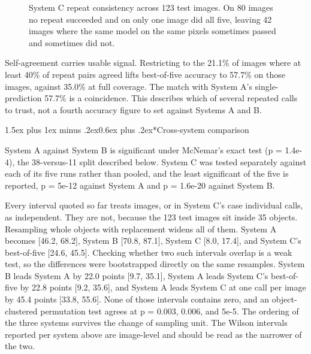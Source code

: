 \documentclass[12pt,letterpaper]{article}
\makeatletter
\renewcommand{\subsection}{\@startsection{subsection}{2}{0pt}%
  {1.5ex plus 1ex minus .2ex}{0.6ex plus .2ex}{\normalsize\itshape}}
\makeatother
\begin{document}
\begin{figure}[H]
\centering
{}
\caption{System C repeat consistency across 123 test images. On 80
images no repeat succeeded and on only one image did all five, leaving
42 images where the same model on the same pixels sometimes passed and
sometimes did not.}
\label{fig:repeats}
\end{figure}

Self-agreement carries usable signal. Restricting to the 21.1\% of
images where at least 40\% of repeat pairs agreed lifts best-of-five
accuracy to 57.7\% on those images, against 35.0\% at full coverage.
The match with System A's single-prediction 57.7\% is a coincidence.
This describes
which of several repeated calls to trust, not a fourth accuracy figure
to set against Systems A and B.

\subsection*{Cross-system comparison}

System A against System B is significant under McNemar's exact test
(p = 1.4e-4), the 38-versus-11 split described below. System C was
tested separately against each of its five runs rather than pooled, and
the least significant of the five is reported, p = 5e-12 against System
A and p = 1.6e-20 against System B.

Every interval quoted so far treats images, or in System C's case
individual calls, as independent. They are not, because the 123 test
images sit inside 35 objects. Resampling whole objects with replacement
widens all of them. System A becomes [46.2, 68.2], System B
[70.8, 87.1], System C [8.0, 17.4], and System C's best-of-five
[24.6, 45.5]. Checking whether two such intervals overlap is a weak
test, so the differences were bootstrapped directly on the same
resamples. System B leads System A by 22.0 points [9.7, 35.1], System A
leads System C's best-of-five by 22.8 points [9.2, 35.6], and System A
leads System C at one call per image by 45.4 points [33.8, 55.6]. None
of those intervals contains zero, and an object-clustered permutation
test agrees at p = 0.003, 0.006, and 5e-5. The ordering of the three
systems survives the change of sampling unit. The Wilson intervals
reported per system above are image-level and should be read as the
narrower of the two.
\end{document}
